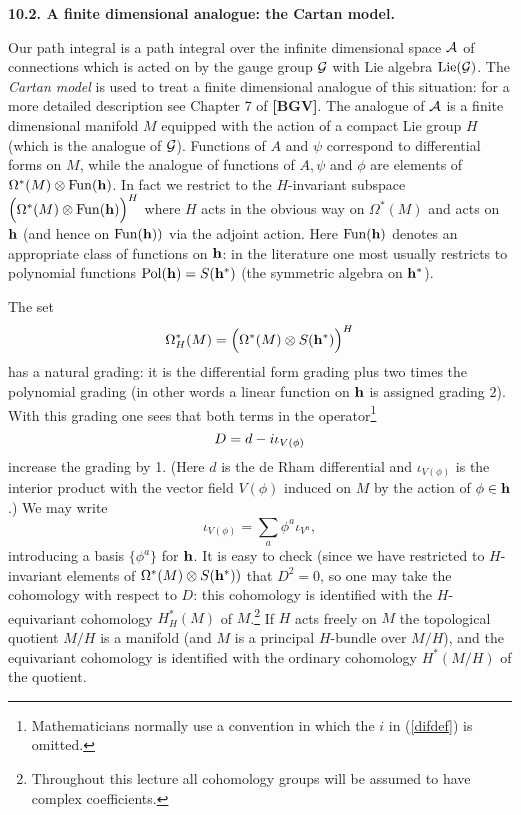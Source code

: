 \documentclass[12pt]{article}
\begin{document}
{\bf 10.2. A finite dimensional analogue: the Cartan model.}

Our path integral is a path integral over the infinite dimensional
space $\cal A$ of connections which is acted on by the 
gauge group ${\cal G}$ with Lie algebra ${\rm Lie}({\cal G})$.
The {\it{Cartan model}} is 
used to treat a  finite dimensional analogue of this situation:
for a more detailed description see Chapter 7 of {\bf [BGV]}.
The analogue of $\cal A$ is a finite dimensional manifold $M$
equipped with the action of a compact Lie group $H$ (which is the 
analogue of ${\cal G}$). Functions of $A$ and $\psi$ correspond to 
differential forms on $M$, while the analogue of 
functions of $A, \psi$ and $\phi$ are elements of 
$\Omega^*(M) \otimes {\rm{ Fun}} ({\bf h})$. In fact we restrict to the 
$H$-invariant subspace 
$\Bigl ( \Omega^* (M) \otimes {\rm{ Fun}} ({\bf h}) \Bigr )^H $ where
$H $ acts in the obvious way on $\Omega^*(M)$ and acts on 
${\bf h}$ (and hence on ${\rm{ Fun}} ({\bf h}))$ via the adjoint action.
Here ${\rm{ Fun}} ({\bf h})$ denotes an appropriate class of functions 
on ${\bf h}$: in the literature one most usually restricts to 
polynomial functions ${\rm Pol} ({\bf h}) = S({\bf h}^*)$ (the symmetric algebra
on ${\bf h}^*$). 

The set 
$$\Omega^*_H(M) = 
\Bigl ( \Omega^* (M) \otimes S({\bf h}^*) \Bigr )^H $$ has a 
natural grading: it is the differential form grading plus two times the
polynomial grading (in other words a linear function on ${\bf h}$ is 
assigned grading $2$). With this grading one sees that both terms in the
operator\footnote{Mathematicians normally  use a convention in which
the $i$ in (\ref{difdef}) is omitted.}
\begin{equation} \labell{difdef}
 D = d  - i \iota_{V(\phi)} 
\end{equation}
increase the grading by 1. (Here $d$ is the de Rham differential and
$\iota_{V(\phi)} $ is the interior product with the vector field
$V(\phi)$ induced on $M$ by the action of $\phi \in {\bf h}$.)
We may write
$$ \iota_{V(\phi)} = \sum_a \phi^a \iota_{V^a}, $$
introducing a basis $\{\phi^a\}$ for ${\bf h}$. It is easy to check
(since we have restricted to $H$-invariant elements of 
$\Omega^*(M) \otimes S({\bf h}^*))$ that
$D^2 = 0 $, so one may take the cohomology with respect to $D$: this cohomology
is identified with the $H$-equivariant cohomology $H^*_H(M)$ 
of $M$.\footnote{Throughout this lecture 
all cohomology groups will be
assumed to have complex coefficients.}
If $H$ acts freely on $M$ the topological 
quotient $M/H$ is a manifold (and $M$ is a principal $H$-bundle over
$M/H$), and the equivariant cohomology is identified with the ordinary 
cohomology $H^*(M/H)$ of the quotient. 
\end{document}
